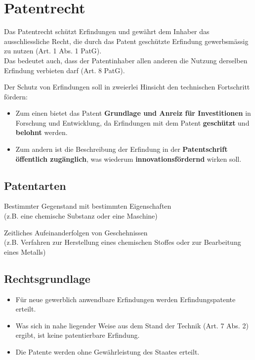 \section{Patentrecht}

Das Patentrecht schützt Erfindungen und gewährt dem Inhaber das
ausschliessliche Recht, die durch das Patent geschützte Erfindung
gewerbsmässig zu nutzen (Art. 1 Abs. 1 PatG).\\
Das bedeutet auch, dass der Patentinhaber allen anderen die Nutzung
derselben Erfindung verbieten darf (Art. 8 PatG).

Der Schutz von Erfindungen soll in zweierlei Hinsicht den technischen
Fortschritt fördern:
\begin{itemize}
	\tightlist
	\item Zum einen bietet das Patent \textbf{Grundlage und Anreiz
	für Investitionen} in Forschung und Entwicklung, da Erfindungen mit dem
	Patent \textbf{geschützt} und \textbf{belohnt} werden.
	\item Zum andern ist die Beschreibung
	der Erfindung in der \textbf{Patentschrift öffentlich zugänglich}, was
	wiederum \textbf{innovationsfördernd} wirken soll.
\end{itemize}


\subsection{Patentarten}

\begin{description}
	\tightlist
	\item[Erzeugnispatent]  Bestimmter Gegenstand mit bestimmten Eigenschaften\\
	(z.B. eine chemische Substanz oder eine Maschine)
	\item[Verfahrenspatent] Zeitliches Aufeinanderfolgen von Geschehnissen\\
	(z.B. Verfahren zur Herstellung eines chemischen Stoffes oder zur
	Bearbeitung eines Metalls)
\end{description}


\subsection{Rechtsgrundlage}

\begin{itemize}
\tightlist
\item Für neue gewerblich anwendbare Erfindungen werden Erfindungspatente
erteilt.
\item Was sich in nahe liegender Weise aus dem Stand der Technik (Art. 7
Abs. 2) ergibt, ist keine patentierbare Erfindung.
\item Die Patente werden ohne Gewährleistung des Staates erteilt.
\end{itemize}



